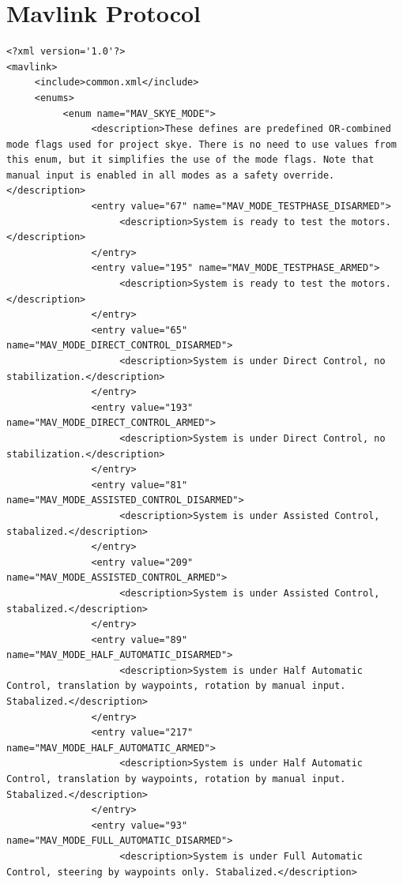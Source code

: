 \section{Mavlink Protocol}
\label{sec:app_mavlink_protocol}

\begin{lstlisting}[captionpos=b, caption="Definition of \textsc{Skye} specific Mavlink messages", label=app_xml]
<?xml version='1.0'?>
<mavlink>
     <include>common.xml</include>
     <enums>
          <enum name="MAV_SKYE_MODE">
               <description>These defines are predefined OR-combined mode flags used for project skye. There is no need to use values from this enum, but it simplifies the use of the mode flags. Note that manual input is enabled in all modes as a safety override.</description>
               <entry value="67" name="MAV_MODE_TESTPHASE_DISARMED">
                    <description>System is ready to test the motors.</description>
               </entry>
               <entry value="195" name="MAV_MODE_TESTPHASE_ARMED">
                    <description>System is ready to test the motors.</description>
               </entry>
               <entry value="65" name="MAV_MODE_DIRECT_CONTROL_DISARMED">
                    <description>System is under Direct Control, no stabilization.</description>
               </entry>
               <entry value="193" name="MAV_MODE_DIRECT_CONTROL_ARMED">
                    <description>System is under Direct Control, no stabilization.</description>
               </entry>
               <entry value="81" name="MAV_MODE_ASSISTED_CONTROL_DISARMED">
                    <description>System is under Assisted Control, stabalized.</description>
               </entry>
               <entry value="209" name="MAV_MODE_ASSISTED_CONTROL_ARMED">
                    <description>System is under Assisted Control, stabalized.</description>
               </entry>
               <entry value="89" name="MAV_MODE_HALF_AUTOMATIC_DISARMED">
                    <description>System is under Half Automatic Control, translation by waypoints, rotation by manual input. Stabalized.</description>
               </entry>
               <entry value="217" name="MAV_MODE_HALF_AUTOMATIC_ARMED">
                    <description>System is under Half Automatic Control, translation by waypoints, rotation by manual input. Stabalized.</description>
               </entry>
               <entry value="93" name="MAV_MODE_FULL_AUTOMATIC_DISARMED">
                    <description>System is under Full Automatic Control, steering by waypoints only. Stabalized.</description>

\end{lstlisting}

